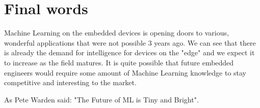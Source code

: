 \section{ Final words}

Machine Learning on the embedded devices is opening doors to various, wonderful applications that were not possible 3 years ago.
We can see that there is already the demand for intelligence for devices on the "edge" and we expect it to increase as the field matures.
It is quite possible that future embedded engineers would require some amount of Machine Learning knowledge to stay competitive and interesting to the market.

As Pete Warden said: "The Future of ML is Tiny and Bright".
